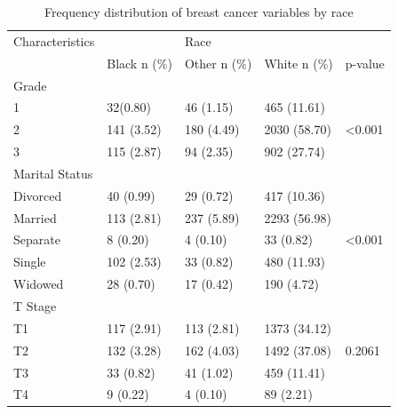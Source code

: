 \documentclass[times,sort&compress,3p]{elsarticle}
\theoremstyle{plain}
\theoremstyle{definition}
\begin{document}
\begin{table}[H]
\centering
\caption{Frequency distribution of breast cancer variables by race}
\label{table2}
\begin{tabular}{lllll} \hline  \hline
Characteristics           &              & Race           &                &                    \\
                          & Black n (\%) & Other n   (\%) & White n   (\%) & p-value            \\ \hline
Grade                     &              &                &                &                    \\
1                         & 32(0.80)     & 46 (1.15)      & 465 (11.61)    &                    \\
2                         & 141 (3.52)   & 180 (4.49)     & 2030 (58.70)   & \textless   0.001  \\
3                         & 115 (2.87)   & 94 (2.35)      & 902 (27.74)    &                    \\ \hline
Marital Status            &              &                &                &                    \\
Divorced                  & 40 (0.99)    & 29 (0.72)      & 417 (10.36)    &                    \\
Married                   & 113 (2.81)   & 237 (5.89)     & 2293 (56.98)   &                    \\
Separate                  & 8 (0.20)     & 4 (0.10)       & 33 (0.82)      & \textless   0.001  \\
Single                    & 102 (2.53)   & 33 (0.82)      & 480 (11.93)    &                    \\
Widowed                   & 28 (0.70)    & 17 (0.42)      & 190 (4.72)     &                    \\ \hline
T   Stage                 &              &                &                &                    \\
T1                        & 117 (2.91)   & 113 (2.81)     & 1373 (34.12)   &                    \\
T2                        & 132 (3.28)   & 162 (4.03)     & 1492 (37.08)   & 0.2061             \\
T3                        & 33 (0.82)    & 41 (1.02)      & 459 (11.41)    &                    \\
T4                        & 9 (0.22)     & 4 (0.10)       & 89 (2.21)      &                    \\ \hline

\end{tabular}
\end{table}
\end{document}
